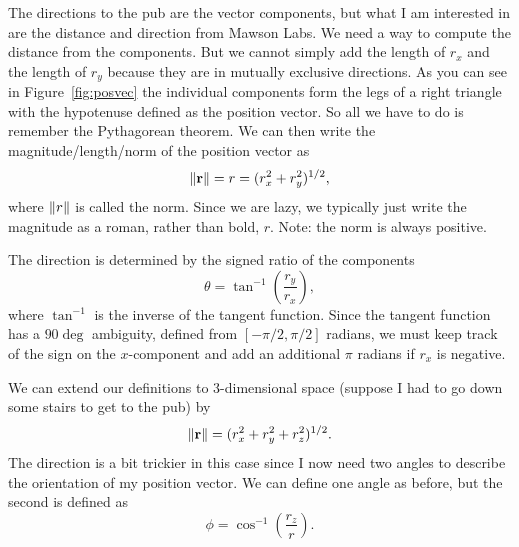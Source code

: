 
The directions to the pub are the vector components, but what I am interested in are the distance and direction from Mawson Labs.  We need a way to compute the distance from the components.  But we cannot simply add the length of $r_x$ and the length of $r_y$ because they are in mutually exclusive directions.  As you can see in Figure~\ref{fig:posvec} the individual components form the legs of a right triangle with the hypotenuse defined as the position vector.  So all we have to do is remember the Pythagorean theorem.  We can then write the magnitude/length/norm of the position vector as
\begin{equation}
    \norm{\vb{r}} = r = (r_x^2 + r_y^2)^{1/2} ,
\end{equation}
where $\norm{r}$ is called the norm.  Since we are lazy, we typically just write the magnitude as a roman, rather than bold, $r$.  Note: the norm is always positive.

The direction is determined by the signed ratio of the components
\begin{equation}
    \theta = \tan^{-1} \left( \frac{r_y}{r_x} \right),
\end{equation}
where $\tan^{-1}$ is the inverse of the tangent function.  Since the tangent
function has a $90\deg$ ambiguity, defined from $[-\pi/2,\pi/2]$ radians, we
must keep track of the sign on the $x$-component and add an additional $\pi$
radians if $r_x$ is negative.

We can extend our definitions to 3-dimensional space (suppose I had to go down
some stairs to get to the pub) by
\begin{equation}
    \norm{\vb{r}} = (r_x^2 + r_y^2 + r_z^2)^{1/2} .
\end{equation}
The direction is a bit trickier in this case since I now need two angles to
describe the orientation of my position vector.  We can define one angle as
before, but the second is defined as
\begin{equation}
    \phi = \cos^{-1} \left( \frac{r_z}{r} \right).
\end{equation}



